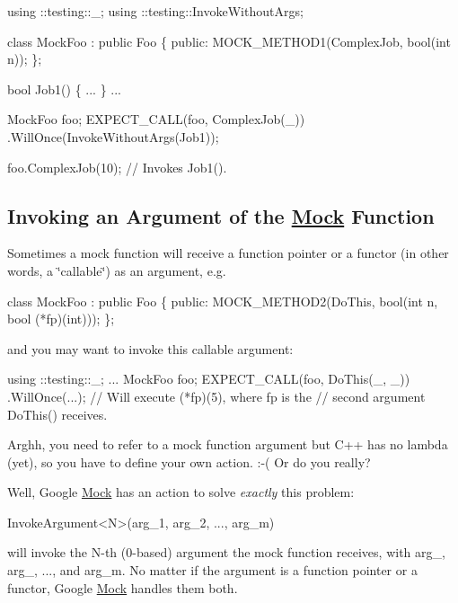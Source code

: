 \begin{DoxyCode}
using ::testing::\_;
using ::testing::InvokeWithoutArgs;

class MockFoo : public Foo \{
 public:
  MOCK\_METHOD1(ComplexJob, bool(int n));
\};

bool Job1() \{ ... \}
...

  MockFoo foo;
  EXPECT\_CALL(foo, ComplexJob(\_))
      .WillOnce(InvokeWithoutArgs(Job1));

  foo.ComplexJob(10);  // Invokes Job1().
\end{DoxyCode}


\subsection*{Invoking an Argument of the \hyperlink{class_mock}{Mock} Function}

Sometimes a mock function will receive a function pointer or a functor (in other words, a \char`\"{}callable\char`\"{}) as an argument, e.\+g.


\begin{DoxyCode}
class MockFoo : public Foo \{
 public:
  MOCK\_METHOD2(DoThis, bool(int n, bool (*fp)(int)));
\};
\end{DoxyCode}


and you may want to invoke this callable argument\+:


\begin{DoxyCode}
using ::testing::\_;
...
  MockFoo foo;
  EXPECT\_CALL(foo, DoThis(\_, \_))
      .WillOnce(...);
  // Will execute (*fp)(5), where fp is the
  // second argument DoThis() receives.
\end{DoxyCode}


Arghh, you need to refer to a mock function argument but C++ has no lambda (yet), so you have to define your own action. \+:-\/( Or do you really?

Well, Google \hyperlink{class_mock}{Mock} has an action to solve {\itshape exactly} this problem\+:


\begin{DoxyCode}
InvokeArgument<N>(arg\_1, arg\_2, ..., arg\_m)
\end{DoxyCode}


will invoke the {\ttfamily N}-\/th (0-\/based) argument the mock function receives, with {\ttfamily arg\+\_}, {\ttfamily arg\+\_}, ..., and {\ttfamily arg\+\_\+m}. No matter if the argument is a function pointer or a functor, Google \hyperlink{class_mock}{Mock} handles them both.

